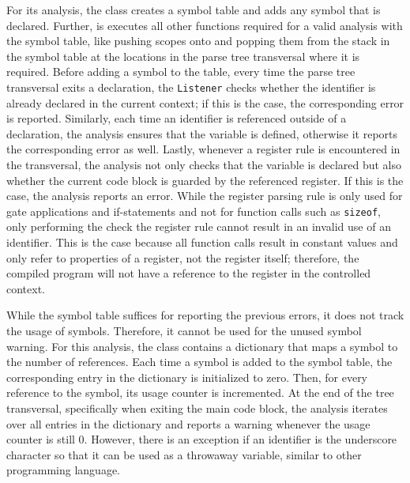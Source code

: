 For its analysis, the class creates a symbol table and adds any symbol that is declared. Further, is executes all other functions required for a valid analysis with the symbol table, like pushing scopes onto and popping them from the stack in the symbol table at the locations in the parse tree transversal where it is required. Before adding a symbol to the table, \ie every time the parse tree transversal exits a declaration, the \texttt{Listener} checks whether the identifier is already declared in the current context; if this is the case, the corresponding error is reported. Similarly, each time an identifier is referenced outside of a declaration, the analysis ensures that the variable is defined, otherwise it reports the corresponding error as well. Lastly, whenever a register rule is encountered in the transversal, the analysis not only checks that the variable is declared but also whether the current code block is guarded by the referenced register. If this is the case, the analysis reports an error. While the register parsing rule is only used for gate applications and if-statements and not for function calls such as \texttt{sizeof}, only performing the check the register rule cannot result in an invalid use of an identifier. This is the case because all function calls result in constant values and only refer to properties of a register, not the register itself; therefore, the compiled program will not have a reference to the register in the controlled context.

While the symbol table suffices for reporting the previous errors, it does not track the usage of symbols. Therefore, it cannot be used for the unused symbol warning. For this analysis, the class contains a dictionary that maps a symbol to the number of references. Each time a symbol is added to the symbol table, the corresponding entry in the dictionary is initialized to zero. Then, for every reference to the symbol, its usage counter is incremented. At the end of the tree transversal, specifically when exiting the main code block, the analysis iterates over all entries in the dictionary and reports a warning whenever the usage counter is still $0$. However, there is an exception if an identifier is the underscore character so that it can be used as a throwaway variable, similar to other programming language.  

